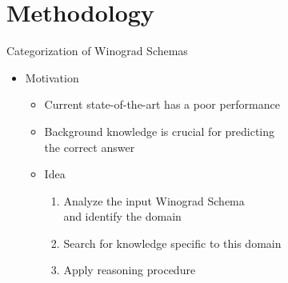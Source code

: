 \documentclass[smaller,dvipsnames,ratio=169]{beamer}
\begin{document}
\section{Methodology}

 \begin{frame}{Categorization of Winograd Schemas}
	\begin{itemize}		
		\normalsize
		\item Motivation
		\begin{itemize}
			\normalsize
			\item Current state-of-the-art has a poor performance
			\item Background knowledge is crucial for predicting\\ the correct answer 
			\item Idea
		\begin{enumerate}
			\normalsize 
			\item Analyze the input Winograd Schema \\and identify the domain
			\item Search for knowledge \alert{specific} to this domain
			\item Apply reasoning procedure 
		\end{enumerate}
		\end{itemize}
	\end{itemize}   
\end{frame}
\end{document}
